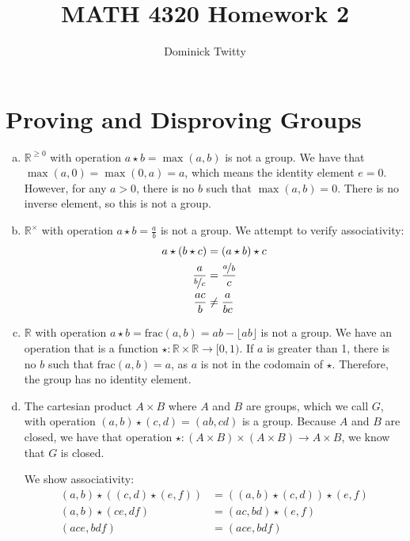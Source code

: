 \documentclass[12pt]{article}
\newcommand*{\Real}{\mathbb{R}}
\begin{document}
\title{MATH 4320 Homework 2}
\author{Dominick Twitty}
\date{}
\maketitle

\section{Proving and Disproving Groups}
\begin{enumerate}[(a)]
\item $\Real^{\geq 0}$ with operation $a \star b = \max(a,b)$ is not a group. We have that $\max(a, 0) = \max(0, a) = a$, which means the identity element $e = 0$. However, for any $a > 0$, there is no $b$ such that $\max(a, b) = 0$. There is no inverse element, so this is not a group.

\item $\Real^\times$ with operation $a \star b = \frac{a}{b}$ is not a group. We attempt to verify associativity:
\begin{align*}
a \star (b \star c) &= (a \star b) \star c\\
\frac{a}{\nicefrac{b}{c}} &= \frac{\nicefrac{a}{b}}{c}\\
\frac{ac}{b} &\neq \frac{a}{bc}
\end{align*}

\item $\Real$ with operation $a \star b = \text{frac}(a, b) = ab - \lfloor ab \rfloor$ is not a group. We have an operation that is a function $\star : \Real \times \Real \rightarrow [0, 1)$. If $a$ is greater than 1, there is no $b$ such that $\text{frac}(a, b) = a$, as $a$ is not in the codomain of $\star$. Therefore, the group has no identity element. 

\item The cartesian product $A \times B$ where $A$ and $B$ are groups, which we call $G$, with operation $(a, b) \star (c, d) = (ab, cd)$ is a group. Because $A$ and $B$ are closed, we have that operation $\star : (A \times B) \times (A \times B) \rightarrow A \times B$, we know that $G$ is closed.

We show associativity:
\begin{align*}
(a,b) \star ((c, d) \star (e, f)) &= ((a,b) \star (c, d)) \star (e, f)\\
(a, b) \star (ce, df) &= (ac, bd) \star (e, f)\\
(ace, bdf) &= (ace, bdf)
\end{align*}


\end{enumerate}
\end{document}
